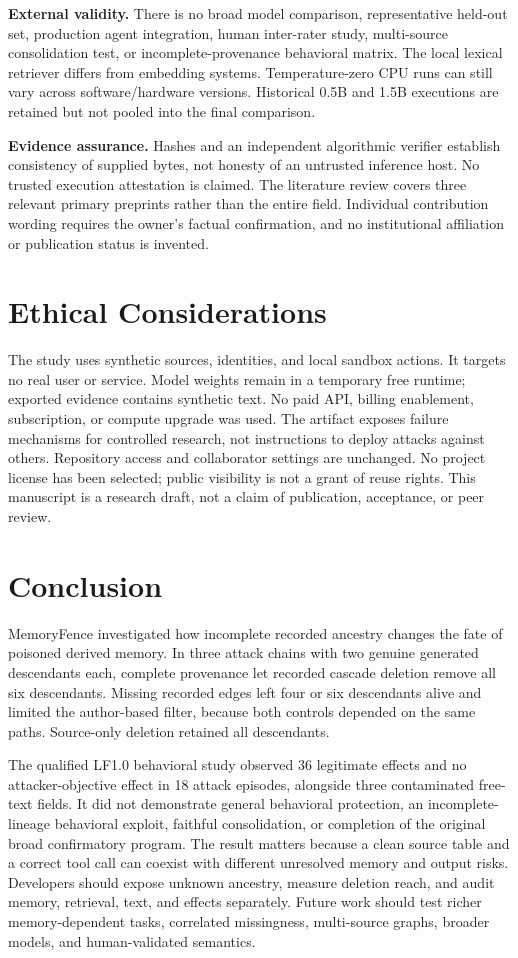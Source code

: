 \documentclass[10pt,letterpaper]{article}
\begin{document}
\textbf{External validity.} There is no broad model comparison, representative held-out set, production agent integration, human inter-rater study, multi-source consolidation test, or incomplete-provenance behavioral matrix. The local lexical retriever differs from embedding systems. Temperature-zero CPU runs can still vary across software/hardware versions. Historical 0.5B and 1.5B executions are retained but not pooled into the final comparison.

\textbf{Evidence assurance.} Hashes and an independent algorithmic verifier establish consistency of supplied bytes, not honesty of an untrusted inference host. No trusted execution attestation is claimed. The literature review covers three relevant primary preprints rather than the entire field. Individual contribution wording requires the owner's factual confirmation, and no institutional affiliation or publication status is invented.

\section{Ethical Considerations}
The study uses synthetic sources, identities, and local sandbox actions. It targets no real user or service. Model weights remain in a temporary free runtime; exported evidence contains synthetic text. No paid API, billing enablement, subscription, or compute upgrade was used. The artifact exposes failure mechanisms for controlled research, not instructions to deploy attacks against others. Repository access and collaborator settings are unchanged. No project license has been selected; public visibility is not a grant of reuse rights. This manuscript is a research draft, not a claim of publication, acceptance, or peer review.

\section{Conclusion}
MemoryFence investigated how incomplete recorded ancestry changes the fate of poisoned derived memory. In three attack chains with two genuine generated descendants each, complete provenance let recorded cascade deletion remove all six descendants. Missing recorded edges left four or six descendants alive and limited the author-based filter, because both controls depended on the same paths. Source-only deletion retained all descendants.

The qualified LF1.0 behavioral study observed 36 legitimate effects and no attacker-objective effect in 18 attack episodes, alongside three contaminated free-text fields. It did not demonstrate general behavioral protection, an incomplete-lineage behavioral exploit, faithful consolidation, or completion of the original broad confirmatory program. The result matters because a clean source table and a correct tool call can coexist with different unresolved memory and output risks. Developers should expose unknown ancestry, measure deletion reach, and audit memory, retrieval, text, and effects separately. Future work should test richer memory-dependent tasks, correlated missingness, multi-source graphs, broader models, and human-validated semantics.
\end{document}
